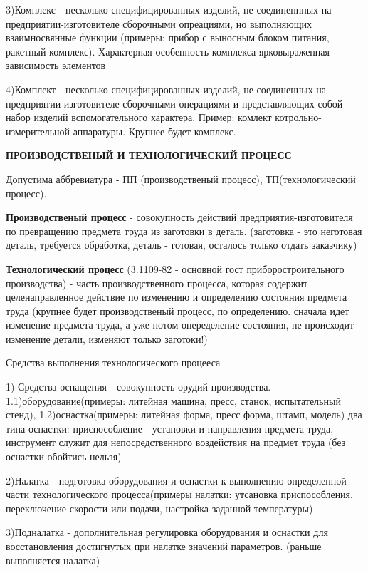{\begin{center}
     \par 3)Комплекс - несколько специфицированных изделий, не соединеннных на предприятии-изготовителе сборочными опреациями, но выполняющих взаимносвянные функции (примеры: прибор с выносным блоком питания, ракетный комплекс). Характерная особенность комплекса ярковыраженная зависимость элементов
     \par 4)Комплект - несколько специфицированных изделий, не соединенных на предприятии-изготовителе сборочными операциями и представляющих собой набор изделий вспомогательного характера. Пример: комлект котрольно-измерительной аппаратуры. Крупнее будет комплекс.
     \par \textbf{ПРОИЗВОДСТВЕНЫЙ И ТЕХНОЛОГИЧЕСКИЙ ПРОЦЕСС}
     \par Допустима аббревиатура - ПП (производственый процесс), ТП(технологический процесс).
     \par \textbf{Производственый процесс} - совокупность действий предприятия-изготовителя по превращению предмета труда из заготовки в деталь. (заготовка - это неготовая деталь, требуется обработка, деталь - готовая, осталось только отдать заказчику)
     \par \textbf{Технологический процесс} (3.1109-82 - основной гост приборостроительного производства) - часть производственного процесса, которая содержит целенаправленное действие по изменению и  определению состояния предмета труда (крупнее будет производственый процесс, по определению. сначала идет изменение предмета труда, а уже потом опеределение состояния, не происходит изменение детали, изменяют только заготоки!)
     \par Средства выполнения технологического процееса
     \par 1) Средства оснащения - совокупность орудий производства. 1.1)оборудование(примеры: литейная машина, пресс, станок, испытательный стенд), 1.2)оснастка(примеры: литейная форма, пресс форма, штамп, модель) два типа оснастки: приспособление - установки и направления предмета труда, инструмент служит для непосредственного воздействия на предмет труда (без оснастки обойтись нельзя) 
     \par 2)Налатка - подготовка оборудования и оснастки к выполнению определенной части технологического процесса(примеры налатки: утсановка приспособления, переключение скорости или подачи, настройка заданной температуры) 
     \par 3)Подналатка - дополнительная регулировка оборудования и оснастки для восстановления достигнутых при налатке значений параметров. (раньше выполняется налатка)

\end{center}}
